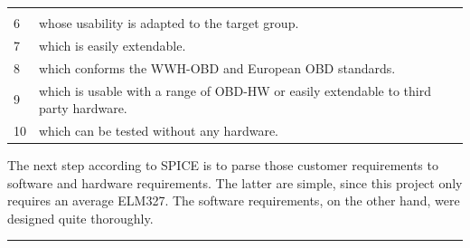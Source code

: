 \begin{longtable}[]{@{}ll@{}}
\begin{minipage}[t]{0.47\columnwidth}
\strut\end{minipage}\tabularnewline
\begin{minipage}[t]{0.47\columnwidth}\raggedright\strut
{6}
\strut\end{minipage} &
\begin{minipage}[t]{0.47\columnwidth}\raggedright\strut
{whose usability is adapted to the target group.}
\strut\end{minipage}\tabularnewline
\begin{minipage}[t]{0.47\columnwidth}\raggedright\strut
{7}
\strut\end{minipage} &
\begin{minipage}[t]{0.47\columnwidth}\raggedright\strut
{which is easily extendable.}
\strut\end{minipage}\tabularnewline
\begin{minipage}[t]{0.47\columnwidth}\raggedright\strut
{8}
\strut\end{minipage} &
\begin{minipage}[t]{0.47\columnwidth}\raggedright\strut
{which conforms the WWH-OBD and European OBD standards.}
\strut\end{minipage}\tabularnewline
\begin{minipage}[t]{0.47\columnwidth}\raggedright\strut
{9}
\strut\end{minipage} &
\begin{minipage}[t]{0.47\columnwidth}\raggedright\strut
{which is usable with a range of OBD-HW or easily extendable to third
party hardware.}
\strut\end{minipage}\tabularnewline
\begin{minipage}[t]{0.47\columnwidth}\raggedright\strut
{10}
\strut\end{minipage} &
\begin{minipage}[t]{0.47\columnwidth}\raggedright\strut
{which can be tested without any hardware.}
\strut\end{minipage}\tabularnewline
\bottomrule
\end{longtable}

{}

{The next step according to SPICE is to parse those customer
requirements to software and hardware requirements. The latter are
simple, since this project only requires an average ELM327. The software
requirements, on the other hand, were designed quite thoroughly. }

{}

\begin{center}\rule{0.5\linewidth}{\linethickness}\end{center}

